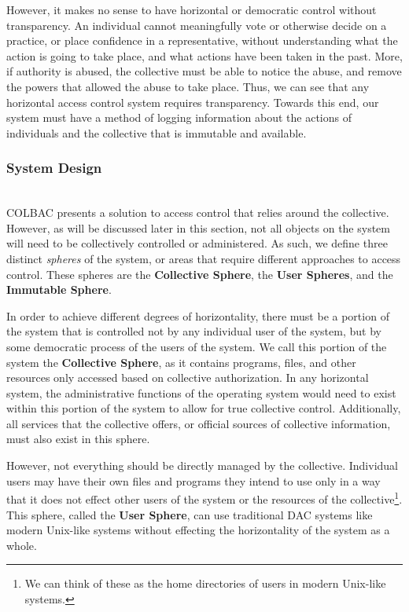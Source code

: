 However, it makes no sense to have horizontal or democratic control without
transparency. An individual cannot meaningfully vote or otherwise decide on a
practice, or place confidence in a representative, without understanding what
the action is going to take place, and what actions have been taken in the past.
More, if authority is abused, the collective must be able to notice the abuse,
and remove the powers that allowed the abuse to take place. Thus, we can see
that any horizontal access control system requires transparency. Towards this
end, our system must have a method of logging information about the actions of
individuals and the collective that is immutable and available.

\subsubsection{System Design}
\label{sec:colbacdesign}
\mbox{}\\
COLBAC presents a solution to access control that relies around the collective.
However, as will be discussed later in this section, not all objects on the
system will need to be collectively controlled or administered. As such, we
define three distinct \textit{spheres} of the system, or areas that require
different approaches to access control. These spheres are the \textbf{Collective
Sphere}, the \textbf{User Spheres}, and the \textbf{Immutable Sphere}.

In order to achieve different degrees of horizontality, there must be a portion
of the system that is controlled not by any individual user of the system, but
by some democratic process of the users of the system. We call this portion of
the system the \textbf{Collective Sphere}, as it contains programs, files, and
other resources only accessed based on collective authorization. In any
horizontal system, the administrative functions of the operating system would
need to exist within this portion of the system to allow for true collective
control. Additionally, all services that the collective offers, or official
sources of collective information, must also exist in this sphere.

However, not everything should be directly managed by the collective. Individual
users may have their own files and programs they intend to use only in a way
that it does not effect other users of the system or the resources of the
collective\footnote{We can think of these as the home directories of users in
modern Unix-like systems.}. This sphere, called the \textbf{User Sphere},
can use traditional DAC systems like modern Unix-like systems without effecting
the horizontality of the system as a whole.

